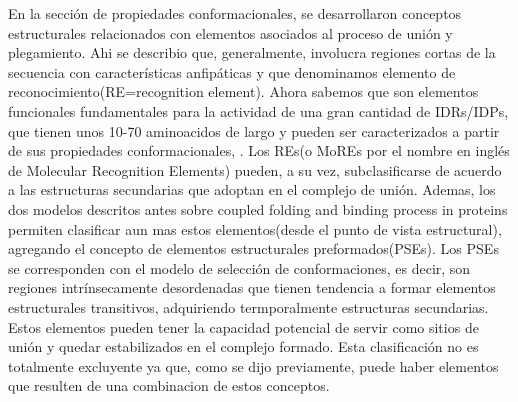 En la sección de propiedades conformacionales, se desarrollaron conceptos estructurales relacionados con elementos asociados al proceso de unión y plegamiento.
Ahi se describio que, generalmente, involucra regiones cortas de la secuencia con características anfipáticas y que denominamos elemento de reconocimiento(RE=recognition element). 
Ahora sabemos que son elementos funcionales fundamentales para la actividad de una gran cantidad de IDRs/IDPs, que tienen unos 10-70 aminoacidos de largo y pueden ser caracterizados a partir de sus propiedades conformacionales, 
\cite{mohan2006analysis,vacic2007characterization,oldfield2005coupled}.
Los REs(o MoREs por el nombre en inglés de Molecular Recognition Elements) pueden, a su vez, subclasificarse de acuerdo a las estructuras secundarias que adoptan en el complejo de unión. %
Ademas, los dos modelos descritos antes sobre coupled folding and binding process in proteins permiten clasificar aun mas estos elementos(desde el punto de vista estructural), agregando el concepto de 
elementos estructurales preformados(PSEs)\cite{fuxreiter2004preformed}. 
Los PSEs se corresponden con el modelo de selección de conformaciones, es decir, son regiones intrínsecamente desordenadas que tienen tendencia a formar elementos estructurales transitivos, adquiriendo termporalmente estructuras secundarias.
Estos elementos pueden tener la capacidad potencial de servir como sitios de unión y quedar estabilizados en el complejo formado.
Esta clasificación no es totalmente excluyente ya que, como se dijo previamente, puede haber elementos que resulten de una combinacion de estos conceptos.


